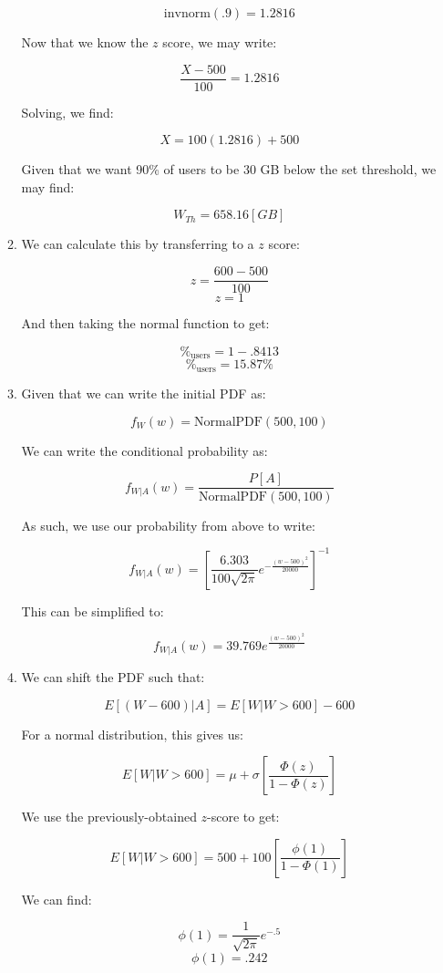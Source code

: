 \begin{enumerate}
\begin{enumerate}
        $$\text{invnorm}(.9)=1.2816$$

        Now that we know the $z$ score, we may write:

        $$\frac{X-500}{100}=1.2816$$

        Solving, we find:

        $$X=100(1.2816)+500$$

        Given that we want 90\% of users to be 30 GB below the set threshold, we may find: 

        $$\boxed{W_{Th}=658.16[\si{GB}]}$$

      \item We can calculate this by transferring to a $z$ score:

        $$z=\frac{600-500}{100}$$
        $$z=1$$

        And then taking the normal function to get:

        $$\%_{\text{users}}=1-.8413$$
        $$\boxed{\%_{\text{users}}=15.87\%}$$

      \item Given that we can write the initial PDF as:

        $$f_W(w)=\text{NormalPDF}(500,100)$$

        We can write the conditional probability as:

        $$f_{W|A}(w)=\frac{P[A]}{\text{NormalPDF}(500,100)}$$

        As such, we use our probability from above to write:

        $$f_{W|A}(w)=\left[\frac{6.303}{100\sqrt{2\pi}}e^{-\frac{(w-500)^2}{20000}}\right]^{-1}$$

        This can be simplified to:

        $$\boxed{f_{W|A}(w)=39.769e^{\frac{(w-500)^2}{20000}}}$$

      \item We can shift the PDF such that:

        $$E[(W-600)|A]=E[W|W>600]-600$$

        For a normal distribution, this gives us:

        $$E[W|W>600]=\mu+\sigma\left[ \frac{\Phi(z)}{1-\Phi(z)} \right]$$

        We use the previously-obtained $z$-score to get:

        $$E[W|W>600]=500+100\left[ \frac{\phi(1)}{1-\Phi(1)} \right]$$

        We can find:

        $$\phi(1)=\frac{1}{\sqrt{2\pi}}e^{-.5}$$
        $$\phi(1)=.242$$


\end{enumerate}
\end{enumerate}
